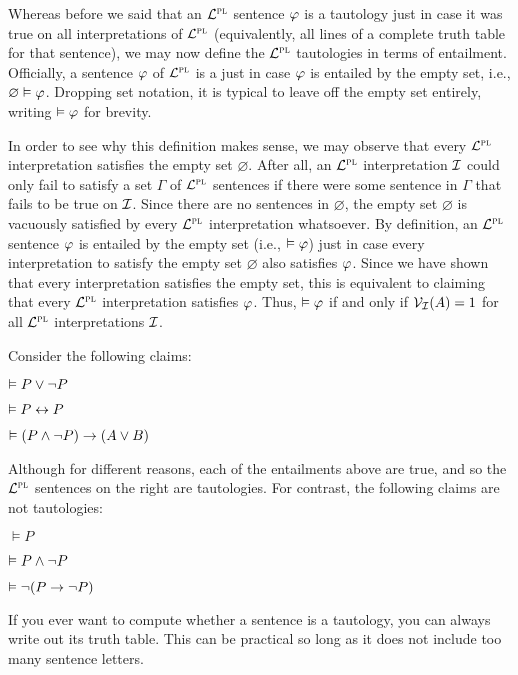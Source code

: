Whereas before we said that an $\mathcal{L}^{\textsc{pl}}$ sentence $\varphi$ is a tautology just in case it was true on all interpretations of $\mathcal{L}^{\textsc{pl}}$ (equivalently, all lines of a complete truth table for that sentence), we may now define the $\mathcal{L}^{\textsc{pl}}$ tautologies in terms of entailment.
Officially, a sentence $\varphi$ of $\mathcal{L}^{\textsc{pl}}$ is a  just in case $\varphi$ is entailed by the empty set, i.e., $\varnothing \vDash \varphi$.
Dropping set notation, it is typical to leave off the empty set entirely, writing $\vDash \varphi$ for brevity.

In order to see why this definition makes sense, we may observe that every $\mathcal{L}^{\textsc{pl}}$ interpretation satisfies the empty set $\varnothing$.
After all, an $\mathcal{L}^{\textsc{pl}}$ interpretation $\mathcal{I}$ could only fail to satisfy a set $\Gamma$ of $\mathcal{L}^{\textsc{pl}}$ sentences if there were some sentence in $\Gamma$ that fails to be true on $\mathcal{I}$.
Since there are no sentences in $\varnothing$, the empty set $\varnothing$ is vacuously satisfied by every $\mathcal{L}^{\textsc{pl}}$ interpretation whatsoever.
By definition, an $\mathcal{L}^{\textsc{pl}}$ sentence $\varphi$ is entailed by the empty set (i.e., $\vDash \varphi$) just in case every interpretation to satisfy the empty set $\varnothing$ also satisfies $\varphi$.
Since we have shown that every interpretation satisfies the empty set, this is equivalent to claiming that every $\mathcal{L}^{\textsc{pl}}$ interpretation satisfies $\varphi$. 
Thus, $\vDash \varphi$ if and only if $\mathcal{V}_{\mathcal{I}}(A)=1$ for all $\mathcal{L}^{\textsc{pl}}$ interpretations $\mathcal{I}$.   

Consider the following claims:

\begin{earg}
  \item[] $\vDash P \vee \neg P$
  \item[] $\vDash P \leftrightarrow P$
  \item[] $\vDash (P \wedge\neg P)\rightarrow (A \vee B)$
\end{earg}

Although for different reasons, each of the entailments above are true, and so the $\mathcal{L}^{\textsc{pl}}$ sentences on the right are tautologies.
For contrast, the following claims are not tautologies:

\begin{earg}
  \item[] $\models P$
  \item[] $\vDash P \wedge \neg P$
  \item[] $\vDash \neg(P \rightarrow \neg P)$
\end{earg}

If you ever want to compute whether a sentence is a tautology, you can always write out its truth table.
This can be practical so long as it does not include too many sentence letters.






